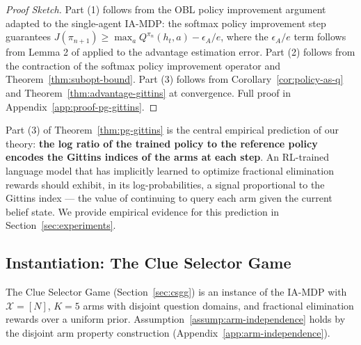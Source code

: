 \documentclass[11pt]{article}
\theoremstyle{plain}
\theoremstyle{definition}
\theoremstyle{remark}
\begin{document}
\begin{proof}[Proof Sketch]
Part (1) follows from the OBL policy improvement argument 
\citep{obel2021} adapted to the single-agent IA-MDP: the 
softmax policy improvement step guarantees 
$J(\pi_{n+1}) \geq \max_a Q^{\pi_n}(h_t, a) - \epsilon_A/e$, 
where the $\epsilon_A/e$ term follows from Lemma 2 of 
\citet{obel2021} applied to the advantage estimation error.
Part (2) follows from the contraction of the softmax policy 
improvement operator and Theorem~\ref{thm:subopt-bound}.
Part (3) follows from Corollary~\ref{cor:policy-as-q} and 
Theorem~\ref{thm:advantage-gittins} at convergence.
Full proof in Appendix~\ref{app:proof-pg-gittins}.
\end{proof}

Part (3) of Theorem~\ref{thm:pg-gittins} is the central 
empirical prediction of our theory: \textbf{the log ratio of 
the trained policy to the reference policy encodes the Gittins 
indices of the arms at each step}. An RL-trained language model 
that has implicitly learned to optimize fractional elimination 
rewards should exhibit, in its log-probabilities, a signal 
proportional to the Gittins index — the value of continuing 
to query each arm given the current belief state. We provide 
empirical evidence for this prediction in 
Section~\ref{sec:experiments}.

\subsection{Instantiation: The Clue Selector Game}

The Clue Selector Game (Section~\ref{sec:csgg}) is an instance 
of the IA-MDP with $\mathcal{X} = [N]$, $K = 5$ arms with 
disjoint question domains, and fractional elimination rewards 
over a uniform prior. Assumption~\ref{assump:arm-independence} 
holds by the disjoint arm property construction 
(Appendix~\ref{app:arm-independence}).
\end{document}
